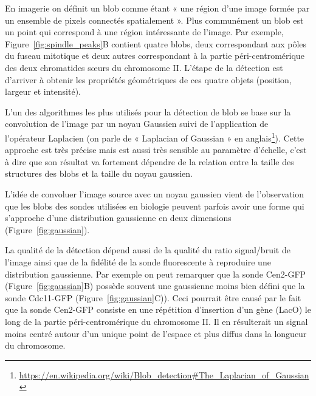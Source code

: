 \documentclass[12pt,a4paper,twoside,openright]{book}
\begin{document}
En imagerie on définit un blob comme étant « une région d'une image
formée par un ensemble de pixels connectés spatialement ». Plus
communément un blob est un point qui correspond à une région
intéressante de l'image. Par exemple, Figure~\ref{fig:spindle_peaks}B
contient quatre blobs, deux correspondant aux pôles du fuseau mitotique
et deux autres correspondant à la partie péri-centromérique des deux
chromatides sœurs du chromosome II. L'étape de la détection est
d'arriver à obtenir les propriétés géométriques de ces quatre objets
(position, largeur et intensité).

L'un des algorithmes les plus utilisés pour la détection de blob se base
sur la convolution de l'image par un noyau Gaussien suivi de
l'application de l'opérateur Laplacien (on parle de « Laplacian of
Gaussian » en anglais\footnote{\url{https://en.wikipedia.org/wiki/Blob_detection\#The_Laplacian_of_Gaussian}}).
Cette approche est très précise mais est aussi très sensible au
paramètre d'échelle, c'est à dire que son résultat va fortement dépendre
de la relation entre la taille des structures des blobs et la taille du
noyau gaussien.

L'idée de convoluer l'image source avec un noyau gaussien vient de
l'observation que les blobs des sondes utilisées en biologie peuvent
parfois avoir une forme qui s'approche d'une distribution gaussienne en
deux dimensions (Figure~\ref{fig:gaussian}).

La qualité de la détection dépend aussi de la qualité du ratio
signal/bruit de l'image ainsi que de la fidélité de la sonde
fluorescente à reproduire une distribution gaussienne. Par exemple on
peut remarquer que la sonde Cen2-GFP (Figure~\ref{fig:gaussian}B)
possède souvent une gaussienne moins bien défini que la sonde Cdc11-GFP
(Figure~\ref{fig:gaussian}C)). Ceci pourrait être causé par le fait que
la sonde Cen2-GFP consiste en une répétition d'insertion d'un gène
(LacO) le long de la partie péri-centromérique du chromosome II. Il en
résulterait un signal moins centré autour d'un unique point de l'espace
et plus diffus dans la longueur du chromosome.
\end{document}
